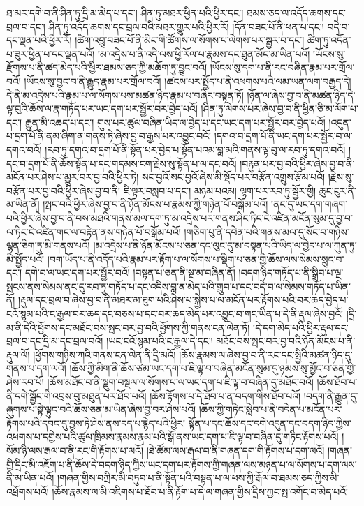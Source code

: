 ཐ་མར་དགེ་བ་ནི་ཤིན་ཏུ་དྲི་མ་མེད་པ་དང་། ཤིན་ཏུ་མཐར་ཕྱིན་པའི་ཕྱིར་དང་། ཐམས་ཅད་ལ་འདོད་ཆགས་དང་བྲལ་བ་དང་། ཤིན་ཏུ་འདོད་ཆགས་དང་བྲལ་བའི་མཐར་གྱུར་པའི་ཕྱིར་རོ། །དོན་བཟང་པོ་ནི་ཕན་པ་དང་། བདེ་བ་དང་ལྡན་པའི་ཕྱིར་རོ། །ཚིག་འབྲུ་བཟང་པོ་ནི་མིང་གི་ཚོགས་ལ་སོགས་པ་ལེགས་པར་སྦྱར་བ་དང་། ཚིག་ཏུ་འདོན་པ་ཟུར་ཕྱིན་པ་དང་ལྡན་པའོ། །མ་འདྲེས་པ་ནི་འདི་ལས་ཕྱི་རོལ་པ་རྣམས་དང་ཐུན་མོང་མ་ཡིན་པའོ། །ཡོངས་སུ་རྫོགས་པ་ནི་ཚད་མེད་པའི་ཕྱིར་ཐམས་ཅད་ཀྱི་མཆོག་ཏུ་བྱུང་བའོ། །ཡོངས་སུ་དག་པ་ནི་རང་བཞིན་རྣམ་པར་གྲོལ་བའོ། །ཡོངས་སུ་བྱང་བ་ནི་རྒྱུད་རྣམ་པར་གྲོལ་བའོ། །ཚངས་པར་སྤྱོད་པ་ནི་འཕགས་པའི་ལམ་ཡན་ལག་བརྒྱད་དེ། དེ་ནི་མ་འདྲེས་པའི་རྣམ་པ་ལ་སོགས་པས་མཚན་ཉིད་རྣམ་པ་བཞིར་བསྟན་ཏོ། །ཉོན་ལ་ཞེས་བྱ་བ་ནི་མཚན་ཉིད་དེ་ལྟ་བུའི་ཆོས་ལ་རྣ་གཏོད་པར་ཡང་དག་པར་སྦྱོར་བར་བྱེད་པའོ། །ཤིན་ཏུ་ལེགས་པར་ཞེས་བྱ་བ་ནི་ཕྱིན་ཅི་མ་ལོག་པ་དང་། རྒྱུན་མི་འཆད་པ་དང་། གུས་པར་ཚུལ་བཞིན་ཡིད་ལ་བྱེད་པ་དང་ཡང་དག་པར་སྦྱོར་བར་བྱེད་པའོ། །འདུན་པ་དྲག་པོ་ནི་ནམ་ཞིག་ན་གནས་ཏེ་ཞེས་བྱ་བ་རྒྱས་པར་འབྱུང་བའོ། །དགའ་བ་དྲག་པོ་ནི་ཡང་དག་པར་སྦྱོར་བ་ལ་དགའ་བའོ། །རབ་ཏུ་དགའ་བ་དྲག་པོ་ནི་སྟོན་པར་བྱེད་པ་སྟོན་པའམ་བླ་མའི་གནས་ལྟ་བུ་ལ་རབ་ཏུ་དགའ་བའོ། །དང་བ་དྲག་པོ་ནི་ཆོས་སྟོན་པ་དང་གདམས་ངག་རྗེས་སུ་སྟོན་པ་ལ་དང་བའོ། །བརྟུན་པར་བྱ་བའི་ཕྱིར་ཞེས་བྱ་བ་ནི་མངོན་པར་ཤེས་པ་མྱུར་བར་བྱ་བའི་ཕྱིར་ཏེ། སང་བྱའོ་སང་བྱའོ་ཞེས་མི་སྡོད་པར་བརྩོན་འགྲུས་རྩོམ་པའོ། །རྗེས་སུ་བརྩོན་པར་བྱ་བའི་ཕྱིར་ཞེས་བྱ་བ་ནི། ཇི་ལྟར་བསླབ་པ་དང་། མཉམ་པའམ། ལྷག་པར་རབ་ཏུ་སྦྱོར་གྱི། ཆུང་ངུར་ནི་མ་ཡིན་ནོ། །སྤང་བའི་ཕྱིར་ཞེས་བྱ་བ་ནི་ཉོན་མོངས་པ་རྣམས་ཀྱི་གཉེན་པོ་བསྒོམ་པའོ། །ནང་དུ་ཡང་དག་གཞག་པའི་ཕྱིར་ཞེས་བྱ་བ་ནི་བས་མཐའི་གནས་མལ་དག་ཏུ་མ་འདྲེས་པར་གནས་ཤིང་ཏིང་ངེ་འཛིན་མངོན་སུམ་དུ་བྱ་བ་ལ་ཏིང་ངེ་འཛིན་གང་ལ་བརྟེན་ནས་གཉེན་པོ་བསྒོམ་པའོ། །གཅིག་པུ་ནི་དབེན་པའི་གནས་མལ་དུ་སོང་བ་གཉིས་ལྷན་ཅིག་ཏུ་མི་གནས་པའོ། །མ་འདྲེས་པ་ནི་ཉོན་མོངས་པ་ཅན་དང་ལུང་དུ་མ་བསྟན་པའི་ཡིད་ལ་བྱེད་པ་ལ་ཀུན་ཏུ་མི་སྤྱོད་པའོ། །བག་ཡོད་པ་ནི་འདོད་པའི་རྣམ་པར་རྟོག་པ་ལ་སོགས་པ་སྡིག་པ་ཅན་གྱི་ཆོས་ལས་སེམས་སྲུང་བ་དང་། དགེ་བ་ལ་ཡང་དག་པར་སྦྱོར་བའོ། །བསྟན་པ་ཅན་ནི་སྔ་མ་བཞིན་ནོ། །བདག་ཉིད་གཏོད་པ་ནི་སྒྲིབ་པ་ལྔ་སྤངས་ནས་སེམས་ནང་དུ་རབ་ཏུ་གཏོད་པ་དང་འདིས་བླ་ན་མེད་པའི་གྲུབ་པ་དང་བདེ་བ་ལ་སེམས་གཏོད་པ་ཡིན་ནོ། །རྡུལ་དང་བྲལ་བ་ཞེས་བྱ་བ་ནི་མཐར་མ་ཐུག་པའི་ཤེས་པ་སྐྱེས་པ་ལ་མངོན་པར་རྟོགས་པའི་བར་ཆད་བྱེད་པ་ངའོ་སྙམ་པའི་ང་རྒྱལ་བར་ཆད་དང་བཅས་པ་དང་བར་ཆད་མེད་པར་འབྱུང་བ་གང་ཡིན་པ་དེ་ནི་རྡུལ་ཞེས་བྱའོ། །དྲི་མ་ནི་དེའི་ཕྱོགས་དང་མཐོང་བས་སྤང་བར་བྱ་བའི་ཕྱོགས་ཀྱི་གནས་ངན་ལེན་ཏོ། །དེ་དག་མེད་པའི་ཕྱིར་རྡུལ་དང་བྲལ་བ་དང་དྲི་མ་དང་བྲལ་བའོ། །ཡང་ངའོ་སྙམ་པའི་ང་རྒྱལ་དེ་དང་། མཐོང་བས་སྤང་བར་བྱ་བའི་ཉོན་མོངས་པ་ནི་རྡུལ་ལོ། །ཕྱོགས་གཉིས་ཀའི་གནས་ངན་ལེན་ནི་དྲི་མའོ། །ཆོས་རྣམས་ལ་ཞེས་བྱ་བ་ནི་རང་དང་སྤྱིའི་མཚན་ཉིད་དུ་གནས་པ་དག་ལའོ། །ཆོས་ཀྱི་མིག་ནི་ཆོས་ཙམ་ཡང་དག་པ་ཇི་ལྟ་བ་བཞིན་མངོན་སུམ་དུ་ཉམས་སུ་མྱོང་བ་ཅན་གྱི་ཤེས་རབ་པོ། །ཆོས་མཐོང་བ་ནི་སྡུག་བསྔལ་ལ་སོགས་པ་ལ་ཡང་དག་པ་ཇི་ལྟ་བ་བཞིན་དུ་མཐོང་བའོ། །ཆོས་ཐོབ་པ་ནི་དགེ་སྦྱོང་གི་འབྲས་བུ་མཐུན་པར་ཐོབ་པའོ། །ཆོས་རྟོགས་པ་དེ་ཐོབ་པ་ན་བདག་གིས་ཐོབ་པའོ། །བདག་ནི་རྒྱུན་དུ་ཞུགས་པ་སྟེ་ལྟུང་བའི་ཆོས་ཅན་མ་ཡིན་ཞེས་བྱ་བར་ཤེས་པའོ། །ཆོས་ཀྱི་གཏིང་སླེབ་པ་ནི་བདེན་པ་མངོན་པར་རྟོགས་པའི་དབང་དུ་བྱས་ཏེ་ཤེས་ནས་དད་པ་རྙེད་པའི་ཕྱིར། སྟོན་པ་དང་ཆོས་དང་དགེ་འདུན་དང་བདག་ཉིད་ཀྱིས་འཕགས་པ་དགྱེས་པའི་ཚུལ་ཁྲིམས་རྣམས་རྣམ་པའི་སྒོ་ནས་ཡང་དག་པ་ཇི་ལྟ་བ་བཞིན་དུ་གཏིང་རྟོགས་པའོ། །སོམ་ཉི་ལས་རྒལ་བ་ནི་རང་གི་རྟོགས་པ་ལའོ། །ཐེ་ཚོམ་ལས་རྒལ་བ་ནི་གཞན་དག་གི་རྟོགས་པ་དག་ལའོ། །གཞན་གྱི་དྲིང་མི་འཇོག་པ་ནི་ཆོས་དེ་བདག་ཉིད་ཀྱིས་ཡང་དག་པར་རྟོགས་ཀྱི་གཞན་ལས་མཉན་པ་ལ་སོགས་པ་དག་ལས་ནི་མ་ཡིན་པའོ། །གཞན་གྱིས་བཀྲིར་མི་བཏུབ་པ་ནི་སྟོན་པའི་བསྟན་པ་ལ་ཕས་ཀྱི་རྒོལ་བ་ཐམས་ཅད་ཀྱིས་མི་འཕྲོགས་པའོ། །ཆོས་རྣམས་ལ་མི་འཇིགས་པ་ཐོབ་པ་ནི་རྟོག་པ་དེ་ལ་གཞན་གྱིས་དྲིས་ཀྱང་སྤ་འགོང་བ་མེད་པའོ། 